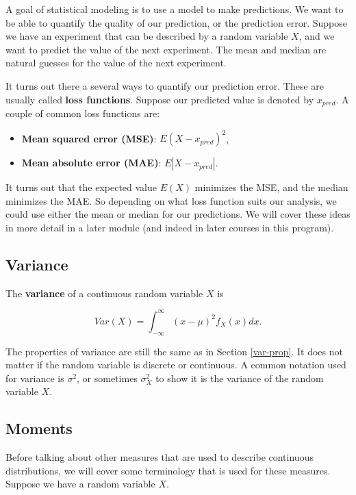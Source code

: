 \documentclass[
]{book}
\providecommand{\tightlist}{%
  \setlength{\itemsep}{0pt}\setlength{\parskip}{0pt}}
\begin{document}
A goal of statistical modeling is to use a model to make predictions. We want to be able to quantify the quality of our prediction, or the prediction error. Suppose we have an experiment that can be described by a random variable \(X\), and we want to predict the value of the next experiment. The mean and median are natural guesses for the value of the next experiment.

It turns out there a several ways to quantify our prediction error. These are usually called \textbf{loss functions}. Suppose our predicted value is denoted by \(x_{pred}\). A couple of common loss functions are:

\begin{itemize}
\tightlist
\item
  \textbf{Mean squared error (MSE)}: \(E(X-x_{pred})^2\),
\item
  \textbf{Mean absolute error (MAE)}: \(E|X-x_{pred}|\).
\end{itemize}

It turns out that the expected value \(E(X)\) minimizes the MSE, and the median minimizes the MAE. So depending on what loss function suits our analysis, we could use either the mean or median for our predictions. We will cover these ideas in more detail in a later module (and indeed in later courses in this program).

\hypertarget{variance-1}{%
\subsection{Variance}\label{variance-1}}

The \textbf{variance} of a continuous random variable \(X\) is

\begin{equation} 
Var(X) = \int_{-\infty}^{\infty} (x-\mu)^2 f_X(x) dx.
\label{eq:4-var}
\end{equation}

The properties of variance are still the same as in Section \ref{var-prop}. It does not matter if the random variable is discrete or continuous. A common notation used for variance is \(\sigma^2\), or sometimes \(\sigma_X^2\) to show it is the variance of the random variable \(X\).

\hypertarget{moments}{%
\subsection{Moments}\label{moments}}

Before talking about other measures that are used to describe continuous distributions, we will cover some terminology that is used for these measures. Suppose we have a random variable \(X\).
\end{document}
